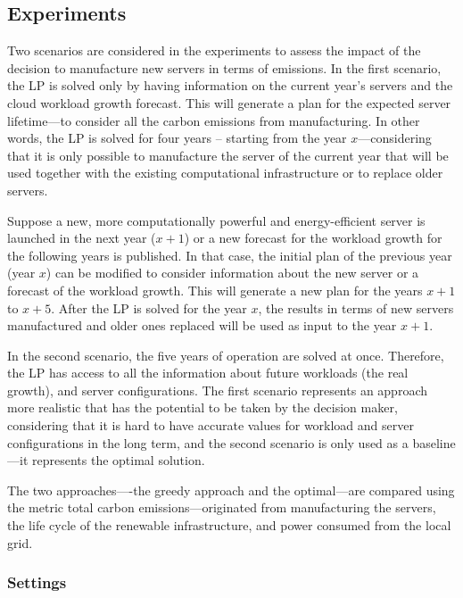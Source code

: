 \subsection{Experiments}


Two scenarios are considered in the experiments to assess the impact of the decision to manufacture new servers in terms of  emissions. In the first scenario, the LP is solved only by having information on the current year's servers and the cloud workload growth forecast. This will generate a plan for the expected server lifetime---to consider all the carbon emissions from manufacturing. In other words, the LP is solved for four years -- starting from the year $x$---considering that it is only possible to manufacture the server of the current year that will be used together with the existing computational infrastructure or to replace older servers. 

Suppose a new, more computationally powerful and energy-efficient server is launched in the next year ($x+1$) or a new forecast for the workload growth for the following years is published. In that case, the initial plan of the previous year (year $x$) can be modified to consider information about the new server or a forecast of the workload growth. This will generate a new plan for the years $x+1$ to $x+5$. After the LP is solved for the year $x$, the results in terms of new servers manufactured and older ones replaced will be used as input to the year $x +1$. 

In the second scenario, the five years of operation are solved at once. Therefore, the LP has access to all the information about future workloads (the real growth), and server configurations. The first scenario represents an approach more realistic that has the potential to be taken by the decision maker, considering that it is hard to have accurate values for workload and server configurations in the long term, and the second scenario is only used as a baseline---it represents the optimal solution.

The two approaches----the greedy approach and the optimal---are compared using the metric total carbon emissions---originated from manufacturing the servers, the life cycle of the renewable infrastructure, and power consumed from the local grid.

\subsubsection{Settings}

